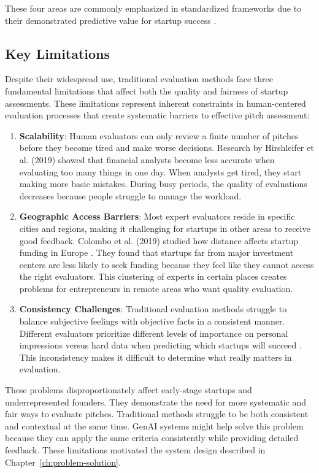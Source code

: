 These four areas are commonly emphasized in standardized frameworks due to their demonstrated predictive value for startup success \cite{Kalvapalle2024}.

\subsection{Key Limitations}\label{subsec:key-limitations}
Despite their widespread use, traditional evaluation methods face three fundamental limitations that affect both the quality and fairness of startup assessments. These limitations represent inherent constraints in human-centered evaluation processes that create systematic barriers to effective pitch assessment:

\begin{enumerate}
    \item \textbf{Scalability}: Human evaluators can only review a finite number of pitches before they become tired and make worse decisions. Research by Hirshleifer et al. (2019) showed that financial analysts become less accurate when \cite{Hirshleifer2019} evaluating too many things in one day. When analysts get tired, they start making more basic mistakes. During busy periods, the quality of evaluations decreases because people struggle to manage the workload.

    \item \textbf{Geographic Access Barriers}: Most expert evaluators reside in specific cities and regions, making it challenging for startups in other areas to receive good feedback. Colombo et al. (2019) studied how distance affects startup funding in Europe \cite{Colombo2019}. They found that startups far from major investment centers are less likely to seek funding because they feel like they cannot access the right evaluators. This clustering of experts in certain places creates problems for entrepreneurs in remote areas who want quality evaluation.

    \item \textbf{Consistency Challenges}: Traditional evaluation methods struggle to balance subjective feelings with objective facts in a consistent manner. Different evaluators prioritize different levels of importance on personal impressions versus hard data when predicting which startups will succeed \cite{Tsay2021VISUALSDI}. This inconsistency makes it difficult to determine what really matters in evaluation.
\end{enumerate}

These problems disproportionately affect early-stage startups and underrepresented founders. They demonstrate the need for more systematic and fair ways to evaluate pitches. Traditional methods struggle to be both consistent and contextual at the same time. GenAI systems might help solve this problem because they can apply the same criteria consistently while providing detailed feedback. These limitations motivated the system design described in Chapter~\ref{ch:problem-solution}.

